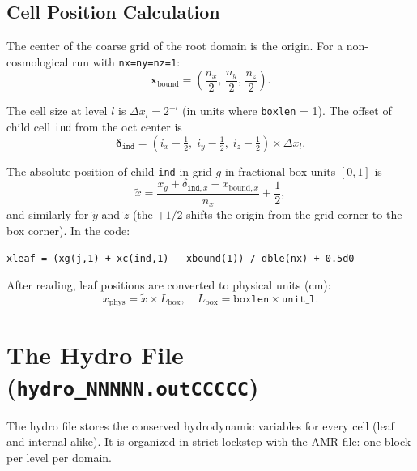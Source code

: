 \documentclass[english,a4paper]{my_memo}
\begin{document}
\subsection{Cell Position Calculation}

The center of the coarse grid of the root domain is the origin.
For a non-cosmological run with \texttt{nx=ny=nz=1}:
\begin{equation}
  \mathbf{x}_\mathrm{bound} = \left(\frac{n_x}{2},\, \frac{n_y}{2},\, \frac{n_z}{2}\right).
\end{equation}

The cell size at level $l$ is $\Delta x_l = 2^{-l}$ (in units where
\texttt{boxlen} = 1).  The offset of child cell \texttt{ind} from the oct
center is
\begin{equation}
  \boldsymbol{\delta}_\texttt{ind}
  = \left(i_x - \tfrac{1}{2},\; i_y - \tfrac{1}{2},\; i_z - \tfrac{1}{2}\right)
    \times \Delta x_l.
\end{equation}

The absolute position of child \texttt{ind} in grid $g$ in fractional box
units $[0, 1]$ is
\begin{equation}
  \tilde{x} = \frac{x_g + \delta_{\texttt{ind},x} - x_{\mathrm{bound},x}}{n_x}
             + \frac{1}{2},
\end{equation}
and similarly for $\tilde{y}$ and $\tilde{z}$ (the $+1/2$ shifts the origin
from the grid corner to the box corner).  In the code:
\begin{lstlisting}
xleaf = (xg(j,1) + xc(ind,1) - xbound(1)) / dble(nx) + 0.5d0
\end{lstlisting}

After reading, leaf positions are converted to physical units (cm):
\begin{equation}
  x_\mathrm{phys} = \tilde{x} \times L_\mathrm{box},
  \quad L_\mathrm{box} = \texttt{boxlen} \times \texttt{unit\_l}.
\end{equation}

\section{The Hydro File (\texttt{hydro\_NNNNN.outCCCCC})}

The hydro file stores the conserved hydrodynamic variables for every cell
(leaf and internal alike).  It is organized in strict lockstep with the AMR
file: one block per level per domain.
\end{document}

